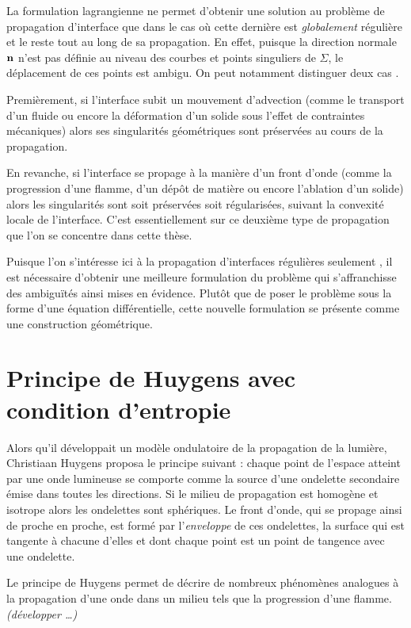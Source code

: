 \par\bigskip
La formulation lagrangienne ne permet d'obtenir une solution au problème de propagation d'interface que dans le cas où cette dernière est \textit{globalement} régulière et le reste tout au long de sa propagation. 
En effet, puisque la direction normale $\mathbf{n}$ n'est pas définie au niveau des courbes et points singuliers de $\Sigma$, le déplacement de ces points est ambigu. 
On peut notamment distinguer deux cas \cite{jiao2007}.
\par
Premièrement, si l'interface subit un mouvement d'advection (comme le transport d'un fluide ou encore la déformation d'un solide sous l'effet de contraintes mécaniques) alors ses singularités géométriques sont préservées au cours de la propagation.
\par
En revanche, si l'interface se propage à la manière d'un front d'onde (comme la progression d'une flamme, d'un dépôt de matière ou encore l'ablation d'un solide) alors les singularités sont soit préservées soit régularisées, suivant la convexité locale de l'interface.
C'est essentiellement sur ce deuxième type de propagation que l'on se concentre dans cette thèse.
\par\bigskip
Puisque l'on s'intéresse ici à la propagation d'interfaces régulières seulement \piecewise, il est nécessaire d'obtenir une meilleure formulation du problème qui s'affranchisse des ambiguïtés ainsi mises en évidence. 
Plutôt que de poser le problème sous la forme d'une équation différentielle, cette nouvelle formulation se présente comme une construction géométrique.

\section{Principe de Huygens avec condition d'entropie}
\label{section:principe_huygens}
\def\p{\vit{p}}
\def\q{\vit{q}}
%
Alors qu'il développait un modèle ondulatoire de la propagation de la lumière, Christiaan Huygens proposa le principe suivant : chaque point de l'espace atteint par une onde lumineuse se comporte comme la source d'une ondelette secondaire émise dans toutes les directions. 
Si le milieu de propagation est homogène et isotrope alors les ondelettes sont sphériques. 
Le front d'onde, qui se propage ainsi de proche en proche, est formé par l'\textit{enveloppe} de ces ondelettes, \ie la surface qui est tangente à chacune d'elles et dont chaque point est un point de tangence avec une ondelette.
\par
Le principe de Huygens permet de décrire de nombreux phénomènes analogues à la propagation d'une onde dans un milieu tels que la progression d'une flamme. 
\textit{(développer \ldots)}

